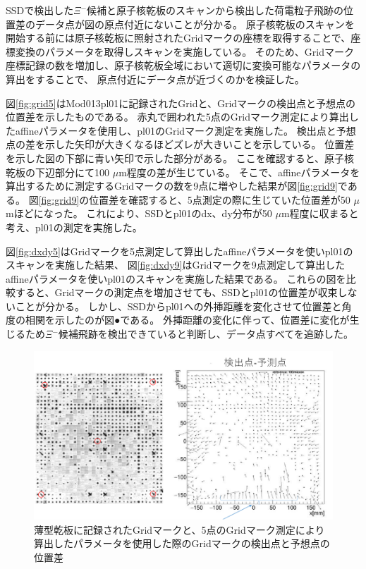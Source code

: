 \documentclass[12pt,a4paper]{jarticle}
\begin{document}
SSDで検出した$\Xi$$^-$候補と原子核乾板のスキャンから検出した荷電粒子飛跡の位置差のデータ点が図の原点付近にないことが分かる。
原子核乾板のスキャンを開始する前には原子核乾板に照射されたGridマークの座標を取得することで、座標変換のパラメータを取得しスキャンを実施している。
そのため、Gridマーク座標記録の数を増加し、原子核乾板全域において適切に変換可能なパラメータの算出をすることで、
原点付近にデータ点が近づくのかを検証した。
\par
図\ref{fig:grid5}はMod013pl01に記録されたGridと、Gridマークの検出点と予想点の位置差を示したものである。
赤丸で囲われた5点のGridマーク測定により算出したaffineパラメータを使用し、pl01のGridマーク測定を実施した。
検出点と予想点の差を示した矢印が大きくなるほどズレが大きいことを示している。
位置差を示した図の下部に青い矢印で示した部分がある。
ここを確認すると、原子核乾板の下辺部分にて100 $\mu$m程度の差が生じている。
そこで、affineパラメータを算出するために測定するGridマークの数を9点に増やした結果が図\ref{fig:grid9}である。
図\ref{fig:grid9}の位置差を確認すると、5点測定の際に生じていた位置差が50 $\mu$mほどになった。
これにより、SSDとpl01のdx、dy分布が50 $\mu$m程度に収まると考え、pl01の測定を実施した。
\par
図\ref{fig:dxdy5}はGridマークを5点測定して算出したaffineパラメータを使いpl01のスキャンを実施した結果、
図\ref{fig:dxdy9}はGridマークを9点測定して算出したaffineパラメータを使いpl01のスキャンを実施した結果である。
これらの図を比較すると、Gridマークの測定点を増加させても、SSDとpl01の位置差が収束しないことが分かる。
しかし、SSDからpl01への外挿距離を変化させて位置差と角度の相関を示したのが図●である。
外挿距離の変化に伴って、位置差に変化が生じるため$\Xi$$^-$候補飛跡を検出できていると判断し、データ点すべてを追跡した。
\begin{figure}[htbp]
  \centering
     \includegraphics[width=150mm]{grid5_pl01scan.png}
  \caption{薄型乾板に記録されたGridマークと、5点のGridマーク測定により算出したパラメータを使用した際のGridマークの検出点と予想点の位置差}
\end{figure}
\end{document}
